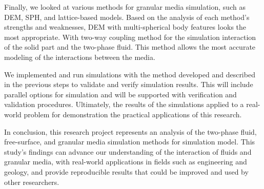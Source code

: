 Finally, we looked at various methods for granular media simulation, such as DEM, SPH, and lattice-based models. Based on the analysis of each method's strengths and weaknesses, DEM with multi-spherical body features looks the most appropriate. With two-way coupling method for the simulation interaction of the solid part and the two-phase fluid. This method allows the most accurate modeling of the interactions between the media.

We implemented and run simulations with the method developed and described in the previous steps to validate and verify simulation results. This will include parallel options for simulation and will be supported with verification and validation procedures.
Ultimately, the results of the simulations applied to a real-world problem for demonstration the practical applications of this research.

In conclusion, this research project represents an analysis of the two-phase fluid, free-surface, and granular media simulation methods for simulation model. This study's findings can advance our understanding of the interaction of fluids and granular media, with real-world applications in fields such as engineering and geology, and provide reproducible results that could be improved and used by other researchers.